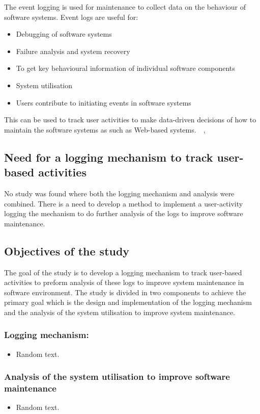 The event logging is used for maintenance to collect data on the behaviour of
software systems. Event logs are useful for:~\cite{Park2017}
\begin{itemize}
    \item Debugging of software systems
    \item Failure analysis and system recovery
    \item To get key behavioural information of individual software components
    \item System utilisation
    \item Users contribute to initiating events in software systems
\end{itemize}
This can be used to track user activities to make data-driven decisions of how
to maintain the software systems as such as Web-based
systems.~\cite{Rong2018}~\cite{Razavi2008},~\cite{Lei2018}

\newpage

\subsection{Need for a logging mechanism to track user-based activities}
No study was found where both the logging mechanism and analysis were combined.
There is a need to develop a method to implement a user-activity logging
the mechanism to do further analysis of the logs to improve software
maintenance.

\subsection{Objectives of the study}
The goal of the study is to develop a logging mechanism to track user-based
activities to preform analysis of these logs to improve system maintenance in
software environment. The study is divided in two components to achieve the
primary goal which is the design and implementation of the logging mechanism
and the analysis of the system utilisation to improve system maintenance.

\subsubsection{Logging mechanism:}
\begin{itemize}
    \item Random text.
\end{itemize}

\subsubsection{Analysis of the system utilisation to improve software maintenance}
\begin{itemize}
    \item Random text.
\end{itemize}

